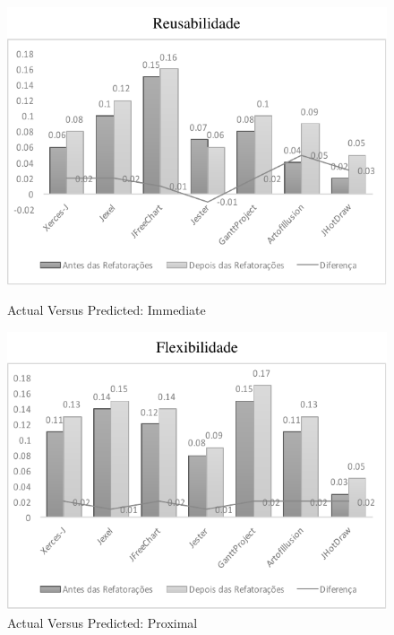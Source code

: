 \begin{figure}[h]    
\begin{minipage}[t]{0.5\textwidth}
\includegraphics[width=\linewidth]{images/GraficoBarraExperimentoReusabilidade}
\caption{Actual Versus Predicted: Immediate}
\label{fig:immediate}
\end{minipage}
\hspace{\fill}
\begin{minipage}[t]{0.5\textwidth}
\includegraphics[width=\linewidth]{images/GraficoBarraExperimentoFlexibilidade}
\caption{Actual Versus Predicted: Proximal}
\label{fig:proximal}
\end{minipage}


\end{figure}
